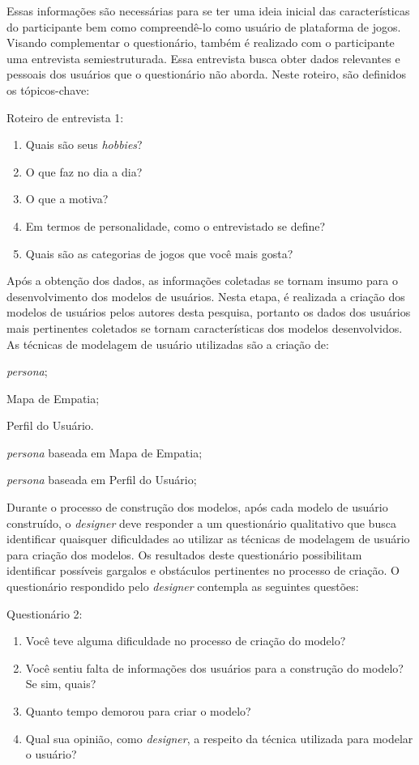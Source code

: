 \documentclass[12pt]{article}
\begin{document}
Essas informações são necessárias para se ter uma ideia inicial das características do participante bem como compreendê-lo como usuário de plataforma de jogos. Visando complementar o questionário, também é realizado com o participante uma entrevista semiestruturada. Essa entrevista busca obter dados relevantes e pessoais dos usuários que o questionário não aborda. Neste roteiro, são definidos os tópicos-chave:
\par Roteiro de entrevista 1:
\begin{enumerate}\setlength\itemsep{0.5em}
    \item Quais são seus \emph{hobbies}?
    \item O que faz no dia a dia?
    \item O que a motiva?
    \item Em termos de personalidade, como o entrevistado se define?
    \item Quais são as categorias de jogos que você mais gosta?
\end{enumerate}
       
Após a obtenção dos dados, as informações coletadas se tornam insumo para o desenvolvimento dos modelos de usuários. Nesta etapa, é realizada a criação dos modelos de usuários pelos autores desta pesquisa, portanto os dados dos usuários mais pertinentes coletados se tornam características dos modelos desenvolvidos. As técnicas de modelagem de usuário utilizadas são a criação de:
\begin{enumerate*}[label=\roman*)]
    \item \emph{persona};
    \item Mapa de Empatia;
    \item Perfil do Usuário.
    \item \emph{persona} baseada em Mapa de Empatia;
    \item \emph{persona} baseada em Perfil do Usuário;
\end{enumerate*}

Durante o processo de construção dos modelos, após cada modelo de usuário construído, o \emph{designer} deve responder a um questionário qualitativo que busca identificar quaisquer dificuldades ao utilizar as técnicas de modelagem de usuário para criação dos modelos. Os resultados deste questionário possibilitam identificar possíveis gargalos e obstáculos pertinentes no processo de criação. O questionário respondido pelo \emph{designer} contempla as seguintes questões: 
\par Questionário 2:
\begin{enumerate}\setlength\itemsep{0.5em}
    \item Você teve alguma dificuldade no processo de criação do modelo?
    \item Você sentiu falta de informações dos usuários para a construção do modelo? Se sim, quais?
    \item Quanto tempo demorou para criar o modelo?
    \item Qual sua opinião, como \emph{designer}, a respeito da técnica utilizada para modelar o usuário?
\end{enumerate} 
       
\end{document}
